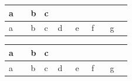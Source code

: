 \begin{tabular}{l*{3}{|>{\centering}p{0.11\linewidth}|}c}
a & b & c \tabularnewline
\hline
a & b & c & d & e & f & g \tabularnewline
\end{tabular}
\begin{longtable}{l*{3}{|>{\centering}p{0.11\linewidth}|}c}
a & b & c \tabularnewline
\hline
a & b & c & d & e & f & g \tabularnewline
\end{longtable}
